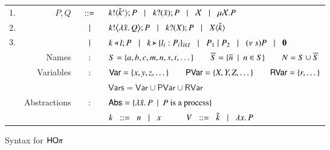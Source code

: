 \begin{figure}[t!]
		\begin{tabular}{lrcl}
			1. &	$P,Q$
			 	&$\;\;::=\;\;$&	$k ! \langle \tilde{k}' \rangle ; P \;\;\;|\;\;\; k ? (\tilde{x}) ; P \;\;\;|\;\;\; \mathcal{X} \;\;\;|\;\;\; \mu \mathcal{X}. P$ \\
			2. & 	&$\;\;\;|\;\;\;$&	$k ! \big\langle \lambda \tilde{x}.\,Q \big\rangle ; P \;\;\;|\;\;\; k ? (X) ; P \;\;\;|\;\;\; X\langle \tilde{k} \rangle$ \\ 
			3. & 	&$\;\;\;|\;\;\;$&	$k \triangleleft l ; P \;\;\;|\;\;\; k \triangleright \{l_i:P_i\}_{i \in I} \;\;\;|\;\;\; 
						P_1 \;|\; P_2 \;\;\;|\;\;\; (\nu\ s) P \;\;\;|\;\;\; \mathbf{0}$ \\
		&	Names & : & 	$S = \{a, b, c, m, n, s, t, \dots\} \qquad \overline{S} = \{\overline{n} \ \ |\ \  n \in S\} \qquad N = S \cup \overline{S}$\\
		&	Variables & : &	$\mathsf{Var} = \{x,y,z, \dots\} \qquad \mathsf{PVar} = \{X, Y, Z, \dots\}
					\qquad \mathsf{RVar} = \{r, \dots\}$\\
		&		& &	$\mathsf{Vars} = \mathsf{Var} \cup \mathsf{PVar} \cup \mathsf{RVar}$\\
		&	Abstractions & : & $\mathsf{Abs} = \{\lambda \tilde{x}.\,P \ \ |\ \  P \textrm{ is a process}\}$\\
		&		& &	$k \;\;::=\;\; n \;\;\;|\;\;\; x \quad \qquad V \;\;::=\;\; \tilde{k} \;\;\;|\;\;\; \lambda x.\,P$
		\end{tabular}
	\caption{Syntax for $\mathsf{HO}\pi$ \label{fig:syntax}}
\end{figure}

